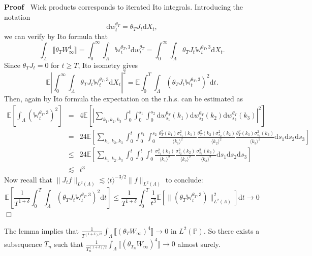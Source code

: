 \documentclass[11pt]{article}
\newcommand{\mathd}{\mathrm{d}}
\newenvironment{proof}{\noindent\textbf{Proof\ }}{\hspace*{\fill}$\Box$\medskip}
\begin{document}
\begin{proof}
  Wick products corresponds to iterated Ito integrals. Introducing the
  notation
  \[ \mathd w_t^{\theta_T} = \theta_T J_t \mathd X_t, \]
  we can verify by Ito formula that
  \[ \int_{\Lambda} \llbracket \theta_T W_{\infty}^4 \rrbracket =
     \int^{\infty}_0 \int_{\Lambda} \mathbb{W}_t^{\theta_T, 3} \mathd
     w^{\theta_T}_t = \int^{\infty}_0 \int_{\Lambda} \theta_T J_t
     \mathbb{W}_t^{\theta_T, 3} \mathd X_t . \]
  Since $\theta_T J_t = 0$ for $t \geqslant T$, Ito isometry gives
  \[ \mathbb{E} \left| \int^{\infty}_0 \int_{\Lambda} \theta_T J_t
     \mathbb{W}_t^{\theta_T, 3} \mathd X_t \right|^2 =\mathbb{E} \int^T_0
     \int_{\Lambda} (\theta_T J_t \mathbb{W}_t^{\theta_T, 3})^2 \mathd t. \]
  Then, again by Ito formula the expectation on the r.h.s. can be estimated as
  {\footnotesize
  \begin{eqnarray*}
    \mathbb{E} \left[ \int_{\Lambda} (\mathbb{W}_t^{\theta_T, 3})^2 \right] &
    = & 4\mathbb{E} \left[ \left| \sum_{k_1, k_2, k_3} \int^t_0 \int^{s_1}_0
    \int^{s_2}_0 \mathd w_{s_1}^{\theta_T} (k_1) \mathd w_{s_2}^{\theta_T}
    (k_2) \mathd w^{\theta_T}_{s_3} (k_3) \right|^2 \right]\\
    & = & 24\mathbb{E} \left[ \sum_{k_1, k_2, k_3} \int^t_0 \int^{s_1}_0
    \int^{s_2}_0 \frac{\theta^2_T (k_1) \sigma^2_{s_1} (k_1)}{\langle k_1
    \rangle^2} \frac{\theta_T^2 (k_2) \sigma^2_{s_2} (k_2)}{\langle k_2
    \rangle^2} \frac{\theta^2_T (k_3) \sigma^2_{s_3} (k_3)}{\langle k_3
    \rangle^2} \mathd s_1 \mathd s_2 \mathd s_3 \right]\\
    & \leqslant & 24\mathbb{E} \left[ \sum_{k_1, k_2, k_3} \int^t_0 \int^t_0
    \int^t_0 \frac{\sigma^2_{s_1} (k_1)}{\langle k_1 \rangle^2}
    \frac{\sigma^2_{s_2} (k_2)}{\langle k_2 \rangle^2} \frac{\sigma^2_{s_3}
    (k_3)}{\langle k_3 \rangle^2} \mathd s_1 \mathd s_2 \mathd s_3 \right]\\
    & \lesssim & t^3
  \end{eqnarray*}}
  Now recall that $\| J_t f \|_{L^2 (\Lambda)} \lesssim \langle t \rangle^{- 3
  / 2} \| f \|_{L^2 (\Lambda)}$ to conclude:
  \[ \mathbb{E} \left[ \frac{1}{T^{1 + \delta}} \int^T_0 \int_{\Lambda}
     (\theta_T J_t \mathbb{W}_t^{\theta_T, 3})^2 \mathd t \right] \leqslant
     \frac{1}{T^{1 + \delta}} \int^T_0 \frac{1}{t^3} \mathbb{E} [\| (\theta_T
     \mathbb{W}_t^{\theta_T, 3}) \|_{L^2 (\Lambda)}^2] \mathd t \rightarrow 0
  \]
\end{proof}

The lemma implies that $\frac{1}{T^{(1 + \delta) / 2}} \int_{\Lambda}
\llbracket (\theta_T W_{\infty})^4 \rrbracket \rightarrow 0$ in $L^2
(\mathbb{P})$. So there exists a subsequence $T_n$ such that $\frac{1}{T_n^{(1
+ \delta) / 2}} \int_{\Lambda} \llbracket (\theta_{T_n} W_{\infty})^4
\rrbracket \rightarrow 0$ almost surely.
\end{document}
